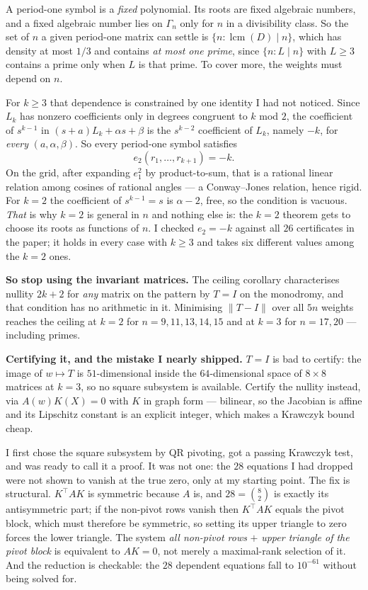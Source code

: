 \documentclass[12pt]{article}
\begin{document}
A period-one symbol is a \emph{fixed} polynomial. Its roots are fixed algebraic
numbers, and a fixed algebraic number lies on $\Gamma_n$ only for $n$ in a
divisibility class. So the set of $n$ a given period-one matrix can settle is
$\{n:\operatorname{lcm}(D)\mid n\}$, which has density at most $1/3$ and
contains \emph{at most one prime}, since $\{n:L\mid n\}$ with $L\ge3$ contains a
prime only when $L$ is that prime. To cover more, the weights must depend on
$n$.

For $k\ge3$ that dependence is constrained by one identity I had not noticed.
Since $L_k$ has nonzero coefficients only in degrees congruent to $k$ mod $2$,
the coefficient of $s^{k-1}$ in $(s+a)L_k+\alpha s+\beta$ is the $s^{k-2}$
coefficient of $L_k$, namely $-k$, for \emph{every} $(a,\alpha,\beta)$. So every
period-one symbol satisfies
\[
  e_2(r_1,\dots,r_{k+1})=-k .
\]
On the grid, after expanding $e_1^2$ by product-to-sum, that is a rational
linear relation among cosines of rational angles --- a Conway--Jones relation,
hence rigid. For $k=2$ the coefficient of $s^{k-1}=s$ is $\alpha-2$, free, so
the condition is vacuous. \emph{That} is why $k=2$ is general in $n$ and nothing
else is: the $k=2$ theorem gets to choose its roots as functions of $n$.
I checked $e_2=-k$ against all $26$ certificates in the paper; it holds in every
case with $k\ge3$ and takes six different values among the $k=2$ ones.

\textbf{So stop using the invariant matrices.} The ceiling corollary
characterises nullity $2k+2$ for \emph{any} matrix on the pattern by $T=I$ on
the monodromy, and that condition has no arithmetic in it. Minimising
$\|T-I\|$ over all $5n$ weights reaches the ceiling at $k=2$ for
$n=9,11,13,14,15$ and at $k=3$ for $n=17,20$ --- including primes.

\textbf{Certifying it, and the mistake I nearly shipped.} $T=I$ is bad to
certify: the image of $w\mapsto T$ is $51$-dimensional inside the
$64$-dimensional space of $8\times8$ matrices at $k=3$, so no square subsystem
is available. Certify the nullity instead, via $A(w)K(X)=0$ with $K$ in graph
form --- bilinear, so the Jacobian is affine and its Lipschitz constant is an
explicit integer, which makes a Krawczyk bound cheap.

I first chose the square subsystem by QR pivoting, got a passing Krawczyk test,
and was ready to call it a proof. It was not one: the $28$ equations I had
dropped were not shown to vanish at the true zero, only at my starting point.
The fix is structural. $K^{\!\top}\!AK$ is symmetric because $A$ is, and
$28=\binom82$ is exactly its antisymmetric part; if the non-pivot rows vanish
then $K^{\!\top}\!AK$ equals the pivot block, which must therefore be symmetric,
so setting its upper triangle to zero forces the lower triangle. The system
\emph{all non-pivot rows} $+$ \emph{upper triangle of the pivot block} is
equivalent to $AK=0$, not merely a maximal-rank selection of it. And the
reduction is checkable: the $28$ dependent equations fall to $10^{-61}$ without
being solved for.
\end{document}
